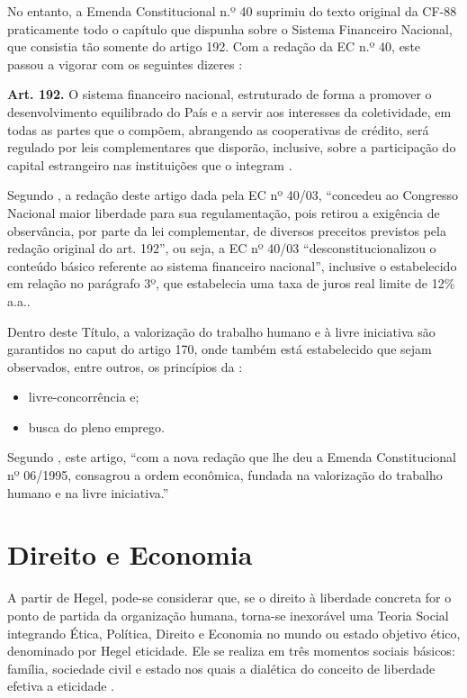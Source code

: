 \documentclass[
	10pt,				%
	openright,			%
	twoside,			%
	a5paper,			%
	english,			%
	french,				%
	spanish,			%
	brazil				%
	]{abntex2}
\renewenvironment{quote}
  {\small\list{}{\rightmargin=0.1cm \leftmargin=4cm}%
   \item\relax}
  {\endlist}
\begin{document}
No entanto, a Emenda Constitucional n.º 40 suprimiu do texto original da
CF-88 praticamente todo o capítulo que dispunha sobre o Sistema
Financeiro Nacional, que consistia tão somente do artigo 192. Com a
redação da EC n.º 40, este passou a vigorar com os seguintes dizeres
\cite{ec40}:

\textbf{Art. 192.} O sistema financeiro nacional, estruturado de forma a
promover o desenvolvimento equilibrado do País e a servir aos interesses
da coletividade, em todas as partes que o compõem, abrangendo as
cooperativas de crédito, será regulado por leis complementares que
disporão, inclusive, sobre a participação do capital estrangeiro nas
instituições que o integram \cite[art.~192]{cf88}.

Segundo , a redação deste artigo dada pela EC
nº 40/03, ``concedeu ao Congresso Nacional maior liberdade para sua
regulamentação, pois retirou a exigência de observância, por parte da
lei complementar, de diversos preceitos previstos pela redação original
do art. 192'', ou seja, a EC nº 40/03 ``desconstitucionalizou o conteúdo
básico referente ao sistema financeiro nacional'', inclusive o
estabelecido em relação no parágrafo 3º, que estabelecia uma taxa de
juros real limite de 12\% a.a..

Dentro deste Título, a valorização do trabalho humano e à livre
iniciativa são garantidos no caput do artigo 170, onde também está
estabelecido que sejam observados, entre outros, os princípios da
\cite[art. 170]{cf88}:

\begin{itemize}
\tightlist
\item
  livre-concorrência e;
\item
  busca do pleno emprego.
\end{itemize}

Segundo , este artigo, ``com a nova redação
que lhe deu a Emenda Constitucional nº 06/1995, consagrou a ordem
econômica, fundada na valorização do trabalho humano e na livre
iniciativa.''

\section{Direito e Economia}\label{sec:diretoeeconomia}

\begin{quote}
A partir de Hegel, pode-se considerar que, se o direito à liberdade
concreta for o ponto de partida da organização humana, torna-se
inexorável uma Teoria Social integrando Ética, Política, Direito e
Economia no mundo ou estado objetivo ético, denominado por Hegel
eticidade. Ele se realiza em três momentos sociais básicos: família,
sociedade civil e estado nos quais a dialética do conceito de liberdade
efetiva a eticidade \cite[p.~15]{drummond}.
\end{quote}
\end{document}
